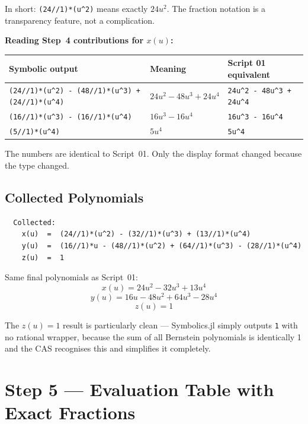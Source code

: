 \documentclass[12pt, a4paper]{article}
\newcommand{\cd}[1]{\texttt{#1}}
\begin{document}
In short: \cd{(24//1)*(u\^{}2)} means exactly $24u^2$.
The fraction notation is a transparency feature,
not a complication.

\begin{examplebox}
\textbf{Reading Step~4 contributions for $x(u)$:}

\medskip
\begin{tabular}{lll}
\toprule
Symbolic output & Meaning & Script 01 equivalent \\
\midrule
\cd{(24//1)*(u\^{}2) - (48//1)*(u\^{}3) + (24//1)*(u\^{}4)} &
  $24u^2 - 48u^3 + 24u^4$ &
  \cd{24u\^{}2 - 48u\^{}3 + 24u\^{}4} \\[4pt]
\cd{(16//1)*(u\^{}3) - (16//1)*(u\^{}4)} &
  $16u^3 - 16u^4$ &
  \cd{16u\^{}3 - 16u\^{}4} \\[4pt]
\cd{(5//1)*(u\^{}4)} &
  $5u^4$ &
  \cd{5u\^{}4} \\
\bottomrule
\end{tabular}

\medskip
The numbers are identical to Script~01.
Only the display format changed because the type changed.
\end{examplebox}

\subsection{Collected Polynomials}

\begin{verbatim}
  Collected:
    x(u)  =  (24//1)*(u^2) - (32//1)*(u^3) + (13//1)*(u^4)
    y(u)  =  (16//1)*u - (48//1)*(u^2) + (64//1)*(u^3) - (28//1)*(u^4)
    z(u)  =  1
\end{verbatim}

Same final polynomials as Script~01:
\[
  x(u) = 24u^2 - 32u^3 + 13u^4
\]
\[
  y(u) = 16u - 48u^2 + 64u^3 - 28u^4
\]
\[
  z(u) = 1
\]

The $z(u) = 1$ result is particularly clean ---
Symbolics.jl simply outputs \cd{1} with no rational wrapper,
because the sum of all Bernstein polynomials is identically 1
and the CAS recognises this and simplifies it completely.


\section{Step 5 --- Evaluation Table with Exact Fractions}
\end{document}
